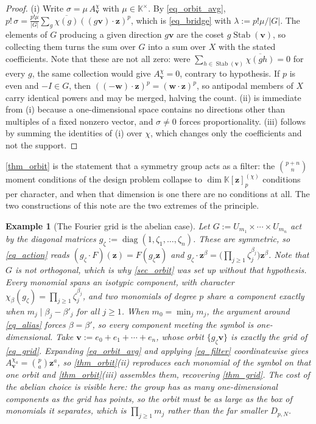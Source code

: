 \documentclass[final]{siamltex}
\DeclareMathOperator{\Stab}{Stab}
\newtheorem{example}[example]{Example}
\newcommand{\K}{\mathbb{K}}
\newcommand{\bz}{\bm{z}}
\newcommand{\bv}{\bm{v}}
\newcommand{\bw}{\bm{w}}
\newcommand{\abs}[1]{\left|#1\right|}
\begin{document}
\begin{proof}
  (i) Write $\sigma = \mu\,A^{\chi}_{\bv}$ with $\mu \in \K^{\times}$.  By
  \eqref{eq_orbit_avg},
  $p!\,\sigma = \frac{p!\mu}{\abs{G}}\sum_{g}\overline{\chi(g)}((g\bv)\cdot\bz)^{p}$,
  which is \eqref{eq_bridge} with $\lambda := p!\mu/\abs{G}$.  The elements of
  $G$ producing a given direction $g\bv$ are the coset $g\Stab(\bv)$, so
  collecting them turns the sum over $G$ into a sum over $X$ with the stated
  coefficients.  Note that these are not all zero: were
  $\sum_{h\in\Stab(\bv)}\overline{\chi(gh)} = 0$ for every $g$, the same
  collection would give $A^{\chi}_{\bv}=0$, contrary to hypothesis.  If $p$ is
  even and $-I \in G$, then
  $((-\bw)\cdot\bz)^{p} = (\bw\cdot\bz)^{p}$, so antipodal members of $X$ carry
  identical powers and may be merged, halving the count.  (ii) is immediate from
  (i) because a one-dimensional space contains no directions other than
  multiples of a fixed nonzero vector, and $\sigma \neq 0$ forces
  proportionality.  (iii) follows by summing the identities of (i) over $\chi$,
  which changes only the coefficients and not the support.
\end{proof}

\cref{thm_orbit} is the statement that a symmetry group acts as a filter: the
$\binom{p+n}{n}$ moment conditions of the design problem collapse to
$\dim \K[\bz]_{p}^{(\chi)}$ conditions per character, and when that dimension is
one there are no conditions at all.  The two constructions of this note are the
two extremes of the principle.

\begin{example}[The Fourier grid is the abelian case]\label{ex_abelian}
  Let $G := U_{m_{1}} \times \cdots \times U_{m_{n}}$ act by the diagonal
  matrices $g_{\zeta} := \operatorname{diag}(1,\zeta_{1},\ldots,\zeta_{n})$.
  These are symmetric, so \eqref{eq_action} reads
  $(g_{\zeta}\cdot F)(\bz) = F(g_{\zeta}\bz)$ and
  $g_{\zeta}\cdot\bz^{\beta} = \bigl(\prod_{j\ge1}\zeta_{j}^{\beta_{j}}\bigr)\bz^{\beta}$.
  Note that $G$ is not orthogonal, which is why \cref{sec_orbit} was set up
  without that hypothesis.  Every monomial spans an isotypic component, with
  character $\chi_{\beta}(g_{\zeta}) = \prod_{j\ge1}\zeta_{j}^{\beta_{j}}$, and
  two monomials of degree $p$ share a component exactly when
  $m_{j} \mid \beta_{j}-\beta'_{j}$ for all $j \ge 1$.  When
  $m_{0} = \min_{j}m_{j}$, the argument around \eqref{eq_alias} forces
  $\beta = \beta'$, so \emph{every} component meeting the symbol is
  one-dimensional.  Take $\bv := e_{0}+e_{1}+\cdots+e_{n}$, whose orbit
  $\{g_{\zeta}\bv\}$ is exactly the grid of \eqref{eq_grid}.  Expanding
  \eqref{eq_orbit_avg} and applying \eqref{eq_filter} coordinatewise gives
  $A^{\chi_{a}}_{\bv} = \binom{p}{a}\bz^{a}$, so \cref{thm_orbit}(ii) reproduces
  each monomial of the symbol on that one orbit and \cref{thm_orbit}(iii)
  assembles them, recovering \cref{thm_grid}.  The cost of the abelian choice is
  visible here: the group has as many one-dimensional components as the grid has
  points, so the orbit must be as large as the box of monomials it separates,
  which is $\prod_{j\ge1}m_{j}$ rather than the far smaller $D_{p,N}$.
\end{example}
\end{document}
